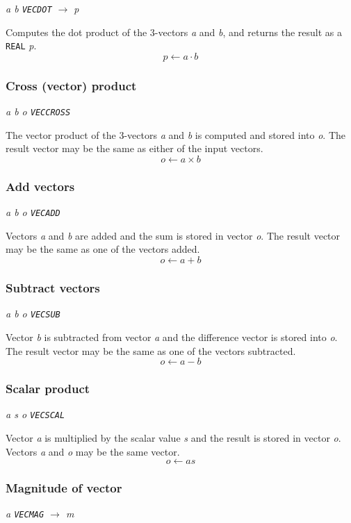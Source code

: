 \documentclass{article}
\begin{document}
{\em a b {\tt VECDOT} $\rightarrow$ p}

Computes the dot product of the 3-vectors {\em a} and {\em b}, and
returns the result as a {\tt REAL} {\em p}.
\[ p \leftarrow a \cdot b \]

\subsubsection{Cross (vector) product}

{\em a b o {\tt VECCROSS}}

The vector product of the 3-vectors {\em a} and {\em b} is computed
and stored into {\em o}.  The result vector may be the same
as either of the input vectors.
\[ o \leftarrow a \times b \]

\subsubsection{Add vectors}

{\em a b o {\tt VECADD}}

Vectors {\em a} and {\em b} are added and the sum is stored in vector
{\em o}.  The result vector may be the same as one of the vectors
added.
\[ o \leftarrow a + b \]

\subsubsection{Subtract vectors}

{\em a b o {\tt VECSUB}}

Vector {\em b} is subtracted from vector {\em a} and the difference
vector is stored into {\em o}.  The result vector may be the same as
one of the vectors subtracted.
\[ o \leftarrow a - b \]

\subsubsection{Scalar product}

{\em a s o {\tt VECSCAL}}

Vector {\em a} is multiplied by the scalar value {\em s} and the
result is stored in vector {\em o}.  Vectors {\em a} and {\em o} may
be the same vector.
\[ o \leftarrow a s \]

\subsubsection{Magnitude of vector}

{\em a {\tt VECMAG} $\rightarrow$ m}
\end{document}
